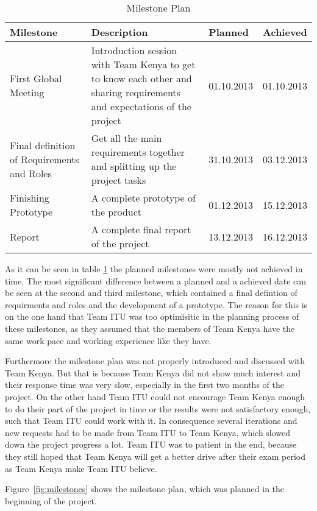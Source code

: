 \begin{table}[htb]
	\centering
	\begin{tabular}{ |  p{4cm} |  p{6cm} | l | l |}
    		\hline
   		Milestone & Description & Planned & Achieved \\ \hline
    		First Global Meeting & Introduction session with Team Kenya to get to know each other and sharing requirements and expectations of the project & 01.10.2013 & 01.10.2013 \\ \hline
    		Final definition of Requirements and Roles & Get all the main requirements together and splitting up the project tasks & 31.10.2013 & 03.12.2013 \\ \hline
    		Finishing Prototype & A complete prototype of the product & 01.12.2013 & 15.12.2013\\ \hline
		Report & A complete final report of the project & 13.12.2013 & 16.12.2013\\ \hline
	\end{tabular}
	\caption{Milestone Plan}
	\label{tab:milestones_table}
\end{table}

As it can be seen in table \ref{tab:milestones_table} the planned milestones were mostly not achieved in time. The most significant difference between a planned and a achieved date can be seen at the second and third milestone, which contained a final defintion of requirments and roles and the development of a prototype. The reason for this is on the one hand that Team ITU was too optimisitic in the planning process of these milestones, as they assumed that the members of Team Kenya have the same work pace and working experience like they have.

Furthermore the milestone plan was not properly introduced and discussed with Team Kenya. But that is because Team Kenya did not show much interest and their response time was very slow, especially in the first two months of the project. On the other hand Team ITU could not encourage Team Kenya enough to do their part of the project in time or the results were not satisfactory enough, such that Team ITU could work with it. In consequence several iterations and new requests had to be made from Team ITU to Team Kenya, which slowed down the project progress a lot. Team ITU was to patient in the end, because they still hoped that Team Kenya will get a better drive after their exam period as Team Kenya make Team ITU believe.

Figure~\ref{fig:milestones} shows the milestone plan, which was planned in the beginning of the project.

